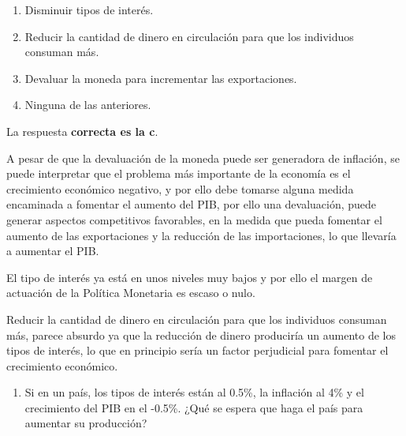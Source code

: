 \documentclass[
  letterpaper,
  DIV=11,
  numbers=noendperiod]{scrreprt}
\providecommand{\tightlist}{%
  \setlength{\itemsep}{0pt}\setlength{\parskip}{0pt}}\usepackage{longtable,booktabs,array}
\begin{document}
\begin{enumerate}
\def\labelenumi{\alph{enumi})}
\item
  Disminuir tipos de interés.
\item
  Reducir la cantidad de dinero en circulación para que los individuos
  consuman más.
\item
  Devaluar la moneda para incrementar las exportaciones.
\item
  Ninguna de las anteriores.
\end{enumerate}

\begin{tcolorbox}[enhanced jigsaw, breakable, leftrule=.75mm, colback=white, left=2mm, colframe=quarto-callout-tip-color-frame, arc=.35mm, bottomrule=.15mm, rightrule=.15mm, toprule=.15mm, opacityback=0]
\begin{minipage}[t]{5.5mm}
\textcolor{quarto-callout-tip-color}{\faLightbulb}
\end{minipage}%
\begin{minipage}[t]{\textwidth - 5.5mm}

La respuesta \textbf{correcta es la c}.

A pesar de que la devaluación de la moneda puede ser generadora de
inflación, se puede interpretar que el problema más importante de la
economía es el crecimiento económico negativo, y por ello debe tomarse
alguna medida encaminada a fomentar el aumento del PIB, por ello una
devaluación, puede generar aspectos competitivos favorables, en la
medida que pueda fomentar el aumento de las exportaciones y la reducción
de las importaciones, lo que llevaría a aumentar el PIB.

El tipo de interés ya está en unos niveles muy bajos y por ello el
margen de actuación de la Política Monetaria es escaso o nulo.

Reducir la cantidad de dinero en circulación para que los individuos
consuman más, parece absurdo ya que la reducción de dinero produciría un
aumento de los tipos de interés, lo que en principio sería un factor
perjudicial para fomentar el crecimiento económico.

\end{minipage}%
\end{tcolorbox}

\begin{enumerate}
\def\labelenumi{\arabic{enumi}.}
\tightlist
\item
  Si en un país, los tipos de interés están al 0.5\%, la inflación al
  4\% y el crecimiento del PIB en el -0.5\%. ¿Qué se espera que haga el
  país para aumentar su producción?
\end{enumerate}
\end{document}
